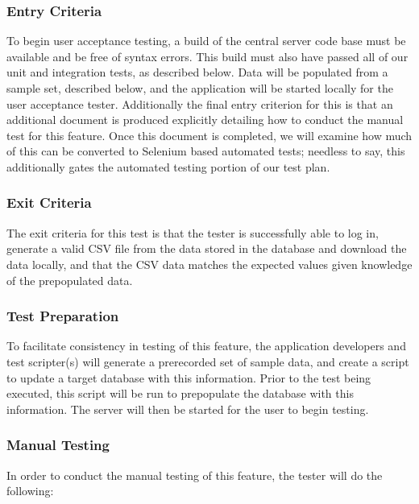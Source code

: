 \documentclass[]{article}
\begin{document}
	\subsubsection{Entry Criteria}
	To begin user acceptance testing, a build of the central server code base must be available and be free of syntax errors.
	This build must also have passed all of our unit and integration tests, as described below. 	Data will be populated from
	a sample set, described below, and the application will be started locally for the user acceptance tester. Additionally
	the final entry criterion for this is that an additional document is produced explicitly detailing how to conduct the
	manual test for this feature. Once this document is completed, we will examine how much of this can
	be converted to Selenium based automated tests; needless to say, this additionally gates the automated testing portion
	of our test plan.
	
	\subsubsection{Exit Criteria}
	The exit criteria for this test is that the tester is successfully able to log in, generate a valid CSV file from
	the data stored in the database and download the data locally, and that the CSV data matches the expected values
	given knowledge of the prepopulated data.
	
	\subsubsection{Test Preparation}	
	To facilitate consistency in testing of this feature, the application developers and test scripter(s) will generate
	a prerecorded set of sample data, and create a script to update a target database with this information. Prior to
	the test being executed, this script will be run to prepopulate the database with this information. The server
	will then be started for the user to begin testing.
	
	\subsubsection{Manual Testing}
	
	In order to conduct the manual testing of this feature, the tester will do the following:
	
\end{document}
